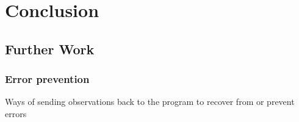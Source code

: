 %
\chapter{Conclusion}
\label{sec:conclusion}

\section{Further Work}

\subsection{Error prevention}
Ways of sending observations back to the program to recover from or prevent errors

